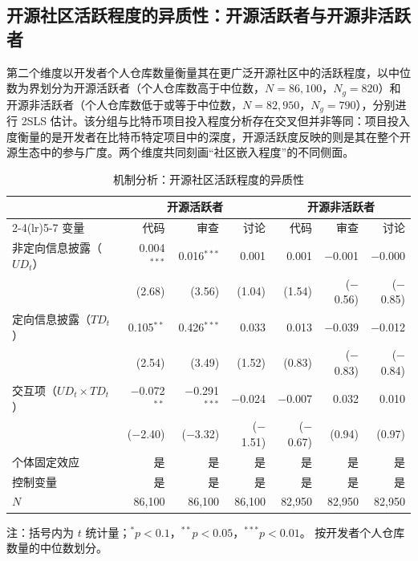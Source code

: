\documentclass[
    type = master, %
    degree = professional,        %
    decl-page,  %
    twoside,                %
    fontset = fandol %
  ]{njuthesis}
\begin{document}
\subsection{开源社区活跃程度的异质性：开源活跃者与开源非活跃者}

第二个维度以开发者个人仓库数量衡量其在更广泛开源社区中的活跃程度，以中位数为界划分为开源活跃者（个人仓库数高于中位数，$N = 86{,}100$，$N_g = 820$）和开源非活跃者（个人仓库数低于或等于中位数，$N = 82{,}950$，$N_g = 790$），分别进行 2SLS 估计。该分组与比特币项目投入程度分析存在交叉但并非等同：项目投入度衡量的是开发者在比特币特定项目中的深度，开源活跃度反映的则是其在整个开源生态中的参与广度。两个维度共同刻画“社区嵌入程度”的不同侧面。

\begin{table}[htbp]
    \centering
    \caption{机制分析：开源社区活跃程度的异质性}
    \label{tab:mechanism-active}
    \small
    \begin{tabularx}{\textwidth}{Xrrrrrr}
        \toprule
        & \multicolumn{3}{c}{开源活跃者}
        & \multicolumn{3}{c}{开源非活跃者} \\
        \cmidrule(lr){2-4}\cmidrule(lr){5-7}
        变量 & 代码 & 审查 & 讨论 & 代码 & 审查 & 讨论 \\
        \midrule
        非定向信息披露（$UD_t$）
            & 0.004$^{***}$ & 0.016$^{***}$ & 0.001
            & 0.001 & $-$0.001 & $-$0.000 \\
            & (2.68) & (3.56) & (1.04)
            & (1.54) & ($-$0.56) & ($-$0.85) \\[0.4em]
        定向信息披露（$TD_t$）
            & 0.105$^{**}$ & 0.426$^{***}$ & 0.033
            & 0.013 & $-$0.039 & $-$0.012 \\
            & (2.54) & (3.49) & (1.52)
            & (0.83) & ($-$0.83) & ($-$0.84) \\[0.4em]
        交互项（$UD_t \times TD_t$）
            & $-$0.072$^{**}$ & $-$0.291$^{***}$ & $-$0.024
            & $-$0.007 & 0.032 & 0.010 \\
            & ($-$2.40) & ($-$3.32) & ($-$1.51)
            & ($-$0.67) & (0.94) & (0.97) \\[0.4em]
        \midrule
        个体固定效应 & 是 & 是 & 是 & 是 & 是 & 是 \\
        控制变量 & 是 & 是 & 是 & 是 & 是 & 是 \\
        $N$ & 86,100 & 86,100 & 86,100 & 82,950 & 82,950 & 82,950 \\
        \bottomrule
    \end{tabularx}
    \begin{minipage}{\textwidth}
        \vspace{0.3em}
        \footnotesize 注：括号内为 $t$ 统计量；$^{*}p<0.1$，$^{**}p<0.05$，$^{***}p<0.01$。
        按开发者个人仓库数量的中位数划分。
    \end{minipage}
\end{table}
\end{document}
